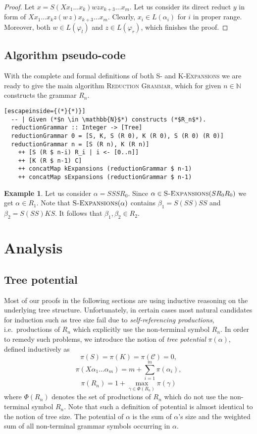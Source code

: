 \documentclass[11pt,a4paper]{amsart}
\theoremstyle{definition}
\newtheorem{example}[theorem]{Example}
\newcommand{\SExpansions}[1]{\textsc{S-Expansions}(#1)}
\newcommand{\potential}[1]{\pi(#1)}
\begin{document}
\begin{proof}
    Let $x = S (X x_1 \ldots x_k) w z x_{k+3} \ldots x_m$. Let us consider its direct reduct $y$ in form of $X x_1 \ldots x_k z (w\, z) x_{k+3} \ldots x_m$. Clearly, $x_i \in  L(\alpha_i)$ for $i$ in proper range. Moreover, both $w \in L(\varphi_l)$ and $z \in L(\varphi_r)$, which finishes the proof.
\end{proof}

\subsection{Algorithm pseudo-code}\label{sec:pceudo-code}
With the complete and formal definitions of both \textsc{S-} and \textsc{K-Expansions} we are ready to give the main algorithm \textsc{Reduction Grammar}, which for given $n \in \mathbb{N}$ constructs the grammar $R_n$.

\begin{lstlisting}[escapeinside={(*}{*)}]
  -- | Given (*$n \in \mathbb{N}$*) constructs (*$R_n$*).
  reductionGrammar :: Integer -> [Tree]
  reductionGrammar 0 = [S, K, S (R 0), K (R 0), S (R 0) (R 0)]
  reductionGrammar n = [S (R n), K (R n)]
  	++ [S (R $ n-i) R_i | i <- [0..n]]
  	++ [K (R $ n-1) C]
  	++ concatMap kExpansions (reductionGrammar $ n-1)
  	++ concatMap sExpansions (reductionGrammar $ n-1)
\end{lstlisting}

\begin{example}
Let us consider $\alpha = S S S R_0$. Since $\alpha \in \SExpansions{S R_0 R_0}$ we get $\alpha \in R_1$. Note that $\SExpansions{\alpha}$ contains $\beta_1 = S (S S) S S$ and
 $\beta_2 = S (S S ) K S$. It follows that $\beta_1, \beta_2 \in R_{2}$.
\end{example}

\section{Analysis}\label{sec:analysis}
\subsection{Tree potential}\label{sec:tree-potential}
Most of our proofs in the following sections are using inductive reasoning on the underlying tree structure. Unfortunately, in certain cases most natural candidates for induction such as tree size fail due to \emph{self-referencing productions}, i.e.~productions of $R_n$ which explicitly use the non-terminal symbol $R_n$. In order to remedy such problems, we introduce the notion of \emph{tree potential} $\potential{\alpha}$, defined inductively as\newpage
\[ \potential{S} = \potential{K} = \potential{\mathcal{C}} = 0,\]
\[ \potential{X \alpha_1 \ldots \alpha_m} = m + \sum_{i=1}^{m}
\potential{\alpha_i}, \]
\[ \potential{R_n} = 1 + \max_{\gamma \in \Phi (R_n)} \potential{\gamma} \]
where $\Phi (R_n)$ denotes the set of productions of $R_n$ which do not use the non-terminal symbol $R_n$. Note that such a definition of potential is almost identical to the notion of tree size. The potential of $\alpha$ is the sum of $\alpha$'s size and the weighted sum of all non-terminal grammar symbols occurring in $\alpha$. 
\end{document}
